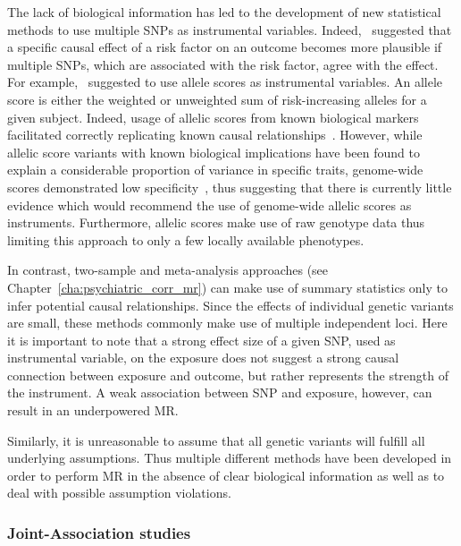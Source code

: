 The lack of biological information has led to the development of new statistical methods to use multiple SNPs as instrumental variables. 
Indeed,~\citet{Burgess2016a} suggested that a specific causal effect of a risk factor on an outcome becomes more plausible if multiple SNPs, which are associated with the risk factor, agree with the effect.
For example,~\citet{Burgess2013} suggested to use allele scores as instrumental variables.
An allele score is either the weighted or unweighted sum of risk-increasing alleles for a given subject.
Indeed, usage of allelic scores from known biological markers facilitated correctly replicating known causal relationships~\cite{Timpson2005,CReactiveProteinCoronaryHeartDiseaseGeneticsCollaborationCCGC2011}.
However, while allelic score variants with known biological implications have been found to explain a considerable proportion of variance in specific traits, genome-wide scores demonstrated low specificity~\cite{Evans2013},
thus suggesting that there is currently little evidence which would recommend the use of genome-wide allelic scores as instruments.
Furthermore, allelic scores make use of raw genotype data thus limiting this approach to only a few locally available phenotypes.

In contrast, two-sample and meta-analysis approaches (see Chapter~\ref{cha:psychiatric_corr_mr}) can make use of summary statistics only to infer potential causal relationships. 
Since the effects of individual genetic variants are small, these methods commonly make use of multiple independent loci.
Here it is important to note that a strong effect size of a given SNP, used as instrumental variable, on the exposure does not suggest a strong causal connection between exposure and outcome, but rather represents the strength of the instrument.
A weak association between SNP and exposure, however, can result in an underpowered MR\@.

Similarly, it is unreasonable to assume that all genetic variants will fulfill all underlying assumptions.
Thus multiple different methods have been developed in order to perform MR in the absence of clear biological information as well as to deal with possible assumption violations.

\subsubsection{Joint-Association studies}
\label{ssub:sensitivity_analysis}

